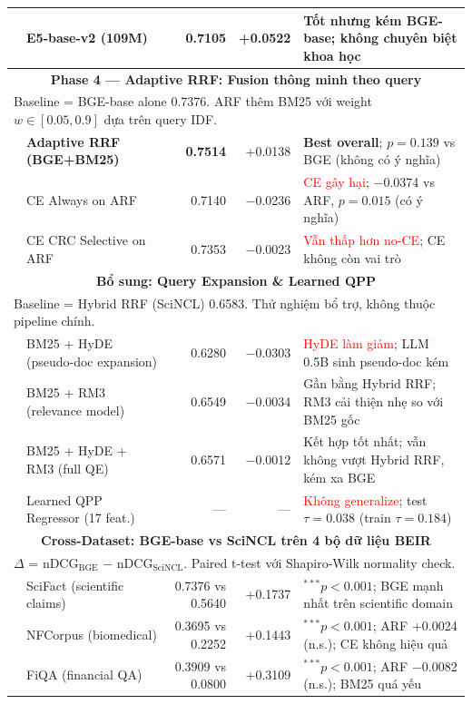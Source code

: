 \begin{table}[htbp]
{\begin{tabular}{llrrl}
& E5-base-v2 (109M)                 & 0.7105 & +0.0522  & Tốt nhưng kém BGE-base; không chuyên biệt khoa học \\
\midrule
\multicolumn{5}{c}{\textbf{Phase 4 — Adaptive RRF: Fusion thông minh theo query}} \\
\multicolumn{5}{l}{\footnotesize Baseline = BGE-base alone 0.7376. ARF thêm BM25 với weight $w \in [0.05,0.9]$ dựa trên query IDF.} \\
\midrule
& \textbf{Adaptive RRF (BGE+BM25)}   & \textbf{0.7514} & +0.0138  & \textbf{Best overall}; $p=0.139$ vs BGE (không có ý nghĩa) \\
& CE Always on ARF                  & 0.7140 & $-$0.0236 & \textcolor{red}{CE gây hại}; $-$0.0374 vs ARF, $p=0.015$ (có ý nghĩa) \\
& CE CRC Selective on ARF           & 0.7353 & $-$0.0023 & \textcolor{red}{Vẫn thấp hơn no-CE}; CE không còn vai trò \\
\midrule
\multicolumn{5}{c}{\textbf{Bổ sung: Query Expansion \& Learned QPP}} \\
\multicolumn{5}{l}{\footnotesize Baseline = Hybrid RRF (SciNCL) 0.6583. Thử nghiệm bổ trợ, không thuộc pipeline chính.} \\
\midrule
& BM25 + HyDE (pseudo-doc expansion) & 0.6280 & $-$0.0303 & \textcolor{red}{HyDE làm giảm}; LLM 0.5B sinh pseudo-doc kém \\
& BM25 + RM3 (relevance model)      & 0.6549 & $-$0.0034  & Gần bằng Hybrid RRF; RM3 cải thiện nhẹ so với BM25 gốc \\
& BM25 + HyDE + RM3 (full QE)        & 0.6571 & $-$0.0012  & Kết hợp tốt nhất; vẫn không vượt Hybrid RRF, kém xa BGE \\
& Learned QPP Regressor (17 feat.) & ---     & ---      & \textcolor{red}{Không generalize}; test $\tau=0.038$ (train $\tau=0.184$) \\
\midrule
\multicolumn{5}{c}{\textbf{Cross-Dataset: BGE-base vs SciNCL trên 4 bộ dữ liệu BEIR}} \\
\multicolumn{5}{l}{\footnotesize $\Delta$ = nDCG$_{\text{BGE}}$ $-$ nDCG$_{\text{SciNCL}}$. Paired t-test với Shapiro-Wilk normality check.} \\
\midrule
& SciFact (scientific claims)       & 0.7376 vs 0.5640 & +0.1737  & ${}^{***}p<0.001$; BGE mạnh nhất trên scientific domain \\
& NFCorpus (biomedical)             & 0.3695 vs 0.2252 & +0.1443  & ${}^{***}p<0.001$; ARF +0.0024 (n.s.); CE không hiệu quả \\
& FiQA (financial QA)               & 0.3909 vs 0.0800 & +0.3109  & ${}^{***}p<0.001$; ARF $-$0.0082 (n.s.); BM25 quá yếu \\

\end{tabular}}
\end{table}
